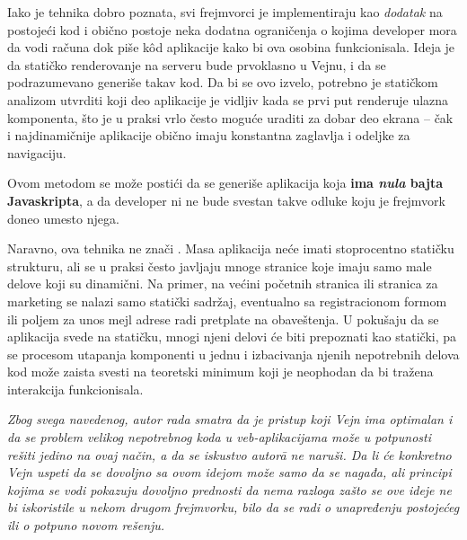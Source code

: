 Iako je tehnika dobro poznata, svi frejmvorci je implementiraju kao \emph{dodatak} na postojeći kod i obično postoje neka dodatna ograničenja o kojima developer mora da vodi računa dok piše kôd aplikacije kako bi ova osobina funkcionisala.
Ideja je da statičko renderovanje na serveru bude prvoklasno u Vejnu, i da se podrazumevano generiše takav kod.
Da bi se ovo izvelo, potrebno je statičkom analizom utvrditi koji deo aplikacije je vidljiv kada se prvi put renderuje ulazna komponenta, što je u praksi vrlo često moguće uraditi za dobar deo ekrana -- čak i najdinamičnije aplikacije obično imaju konstantna zaglavlja i odeljke za navigaciju.

Ovom metodom se može postići da se generiše aplikacija koja \textbf{ima \emph{nula} bajta Javaskripta}, a da developer ni ne bude svestan takve odluke koju je frejmvork doneo umesto njega.

Naravno, ova tehnika ne znači .
Masa aplikacija neće imati stoprocentno statičku strukturu, ali se u praksi često javljaju mnoge stranice koje imaju samo male delove koji su dinamični.
Na primer, na većini početnih stranica ili stranica za marketing se nalazi samo statički sadržaj, eventualno sa registracionom formom ili poljem za unos mejl adrese radi pretplate na obaveštenja.
U pokušaju da se aplikacija svede na statičku, mnogi njeni delovi će biti prepoznati kao statički, pa se procesom utapanja komponenti u jednu i izbacivanja njenih nepotrebnih delova kod može zaista svesti na teoretski minimum koji je neophodan da bi tražena interakcija funkcionisala.

\textit{Zbog svega navedenog, autor rada smatra da je pristup koji Vejn ima optimalan i da se problem velikog nepotrebnog koda u veb-aplikacijama može u potpunosti rešiti jedino na ovaj način, a da se iskustvo autor\=a ne naruši.
Da li će konkretno Vejn uspeti da se dovoljno  sa ovom idejom može samo da se nagađa, ali principi kojima se vodi pokazuju dovoljno prednosti da nema razloga zašto se ove ideje ne bi iskoristile u nekom drugom frejmvorku, bilo da se radi o unapređenju postojećeg ili o potpuno novom rešenju.}
